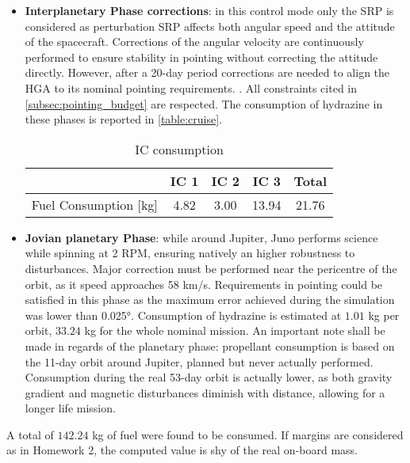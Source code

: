 \begin{itemize}
    \item \textbf{Interplanetary Phase corrections}: in this control mode only the SRP is considered as perturbation SRP affects both angular speed and the attitude of the spacecraft. Corrections of the angular velocity are continuously performed to ensure stability in pointing without correcting the attitude directly. However, after a 20-day period corrections are needed to align the HGA to its nominal pointing requirements. \cite{LL_early_cruise}. All constraints cited in \autoref{subsec:pointing_budget} are respected. 
    The consumption of hydrazine in these phases is reported in \autoref{table:cruise}.

    \begin{table}[H]
        \renewcommand{\arraystretch}{1.3}
        \centering
        \small
        \begin{tabular}{|c|c|c|c|c|}
            \hline
            &\textbf{IC 1} &\textbf{IC 2} & \textbf{IC 3} &\textbf{Total}\\
            \hline
            \hline
            Fuel Consumption [kg] & 4.82 & 3.00 & 13.94 & 21.76 \\
            \hline
        \end{tabular}
        \caption{IC consumption}
        \label{table:cruise}
    \end{table}
    \vspace*{-3mm}

    \item \textbf{Jovian planetary Phase}: while around Jupiter, Juno performs science while spinning at 2 RPM, ensuring natively an higher robustness to disturbances. Major correction must be performed near the pericentre of the orbit, as it speed approaches 58 km/s.  
    Requirements in pointing could be satisfied in this phase as the maximum error achieved during the simulation was lower than 0.025°.  Consumption of hydrazine is estimated at $1.01$ kg per orbit, $33.24$ kg for the whole nominal mission.
    An important note shall be made in regards of the planetary phase: propellant consumption is based on the 11-day orbit around Jupiter, planned but never actually performed. Consumption during the real 53-day orbit is actually lower, as both gravity gradient and magnetic disturbances diminish with distance, allowing for a longer life mission.
\end{itemize}

A total of $142.24$ kg of fuel were found to be consumed. If margins are considered as in Homework 2, the computed value is shy of the real on-board mass.